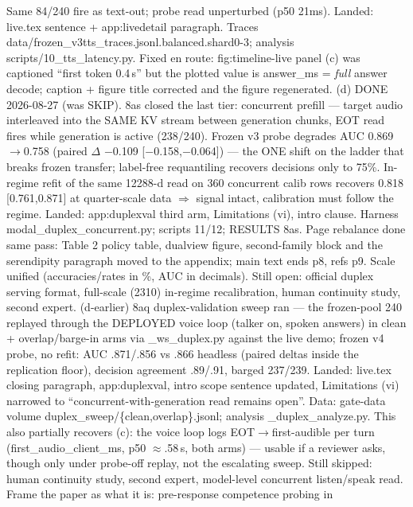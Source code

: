 \begin{itemize}
{  Same 84/240 fire as text-out; probe read unperturbed (p50 21ms).
  Landed: live.tex sentence + app:livedetail paragraph. Traces
  data/frozen\_v3tts\_traces.jsonl.balanced.shard0-3; analysis
  scripts/10\_tts\_latency.py.
  Fixed en route: fig:timeline-live panel (c) was captioned ``first
  token 0.4\,s'' but the plotted value is answer\_ms = \emph{full}
  answer decode; caption + figure title corrected and the figure
  regenerated.
  (d) DONE 2026-08-27 (was SKIP). 8as closed the last tier:
  concurrent prefill --- target audio interleaved into the SAME KV
  stream between generation chunks, EOT read fires while generation
  is active (238/240). Frozen v3 probe degrades AUC 0.869$\to$0.758
  (paired $\Delta$ $-$0.109 [$-$0.158,$-$0.064]) --- the ONE shift on
  the ladder that breaks frozen transfer; label-free requantiling
  recovers decisions only to 75\%. In-regime refit of the same
  12288-d read on 360 concurrent calib rows recovers 0.818
  [0.761,0.871] at quarter-scale data $\Rightarrow$ signal intact,
  calibration must follow the regime. Landed: app:duplexval third
  arm, Limitations (vi), intro clause. Harness
  modal\_duplex\_concurrent.py; scripts 11/12; RESULTS 8as.
  Page rebalance done same pass: Table 2 policy table, dualview
  figure, second-family block and the serendipity paragraph moved to
  the appendix; main text ends p8, refs p9. Scale unified
  (accuracies/rates in \%, AUC in decimals).
  Still open: official duplex serving format, full-scale (2310)
  in-regime recalibration, human continuity study, second expert.
  (d-earlier) 8aq duplex-validation sweep ran
  --- the frozen-pool 240 replayed through the DEPLOYED voice loop
  (talker on, spoken answers) in clean + overlap/barge-in arms via
  \_ws\_duplex.py against the live demo; frozen v4 probe, no refit:
  AUC .871/.856 vs .866 headless (paired deltas inside the
  replication floor), decision agreement .89/.91, barged 237/239.
  Landed: live.tex closing paragraph, app:duplexval, intro scope
  sentence updated, Limitations (vi) narrowed to
  ``concurrent-with-generation read remains open''. Data:
  gate-data volume duplex\_sweep/\{clean,overlap\}.jsonl; analysis
  \_duplex\_analyze.py. This also partially recovers (c): the voice
  loop logs EOT$\to$first-audible per turn
  (first\_audio\_client\_ms, p50 $\approx$.58\,s, both arms) ---
  usable if a reviewer asks, though only under probe-off replay, not
  the escalating sweep. Still skipped: human continuity study, second
  expert, model-level concurrent listen/speak read.
  Frame the paper as what it is: pre-response competence probing in
}
\end{itemize}
